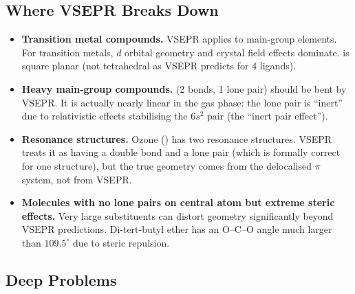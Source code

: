 \documentclass[12pt, a4paper]{book}
\begin{document}
\subsection*{Where VSEPR Breaks Down}

\begin{modelbreaks}
\begin{itemize}[nosep, leftmargin=2em]
  \item \textbf{Transition metal compounds.}
        VSEPR applies to main-group elements.
        For transition metals, $d$ orbital geometry
        and crystal field effects dominate.
         is square planar
        (not tetrahedral as VSEPR predicts for 4 ligands).

  \item \textbf{Heavy main-group compounds.}
         (2 bonds, 1 lone pair) should be bent
        by VSEPR.
        It is actually nearly linear in the gas phase:
        the lone pair is ``inert'' due to relativistic
        effects stabilising the $6s^2$ pair
        (the ``inert pair effect'').

  \item \textbf{Resonance structures.}
        Ozone () has two resonance structures.
        VSEPR treats it as having a double bond and a lone pair
        (which is formally correct for one structure),
        but the true geometry comes from the delocalised
        $\pi$ system, not from VSEPR.

  \item \textbf{Molecules with no lone pairs on central atom
        but extreme steric effects.}
        Very large substituents can distort geometry
        significantly beyond VSEPR predictions.
        Di-tert-butyl ether has an O--C--O angle much
        larger than $109.5^\circ$ due to steric repulsion.
\end{itemize}
\end{modelbreaks}

\subsection*{Deep Problems}
\end{document}
